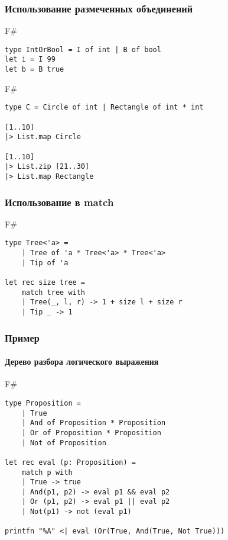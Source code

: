 \documentclass[xetex,mathserif,serif]{beamer}
\begin{document}
	\begin{frame}[fragile]
		\frametitle{Использование размеченных объединений}
		\begin{exampleblock}{F\#}
			\begin{verbatim}
type IntOrBool = I of int | B of bool
let i = I 99
let b = B true
			\end{verbatim}
		\end{exampleblock}
		
		\begin{exampleblock}{F\#}
			\begin{verbatim}
type C = Circle of int | Rectangle of int * int

[1..10]
|> List.map Circle

[1..10]
|> List.zip [21..30]
|> List.map Rectangle
			\end{verbatim}
		\end{exampleblock}
\end{frame}

	\begin{frame}[fragile]
		\frametitle{Использование в match}
		\begin{exampleblock}{F\#}
			\begin{verbatim}
type Tree<'a> =
    | Tree of 'a * Tree<'a> * Tree<'a>
    | Tip of 'a

let rec size tree =
    match tree with
    | Tree(_, l, r) -> 1 + size l + size r
    | Tip _ -> 1
			\end{verbatim}
		\end{exampleblock}
\end{frame}

	\begin{frame}[fragile]
		\frametitle{Пример}
		\framesubtitle{Дерево разбора логического выражения}
		\begin{exampleblock}{F\#}
			\begin{verbatim}
type Proposition =
    | True
    | And of Proposition * Proposition
    | Or of Proposition * Proposition
    | Not of Proposition

let rec eval (p: Proposition) =
    match p with
    | True -> true
    | And(p1, p2) -> eval p1 && eval p2
    | Or (p1, p2) -> eval p1 || eval p2
    | Not(p1) -> not (eval p1)

printfn "%A" <| eval (Or(True, And(True, Not True)))
			\end{verbatim}
		\end{exampleblock}
\end{frame}
\end{document}
